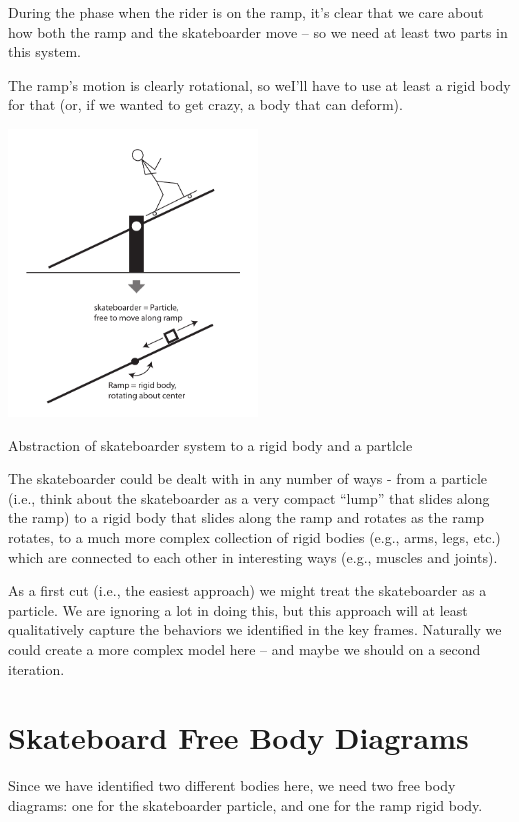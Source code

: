 \documentclass{tufte-handout}
\begin{document}
 During the phase when the rider is on the ramp, it's clear that we care about how both the ramp and the skateboarder move -- so we need at least two parts in this system. 

The ramp's motion is clearly rotational, so weI'll have to use at least a rigid body for that (or, if we wanted to get crazy, a body that can deform).

\begin{marginfigure}
\includegraphics[height=3in]{figs/skateboardabstraction1nocoords}
\caption{Abstraction of skateboarder system to a rigid body and a partlcle}
\end{marginfigure}

The skateboarder could be dealt with in any number of ways - from a particle (i.e., think about the skateboarder as a very compact ``lump'' that slides along the ramp) to a rigid body that slides along the ramp and rotates as the ramp rotates, to a much more complex collection of rigid bodies (e.g., arms, legs, etc.) which are connected to each other in interesting ways (e.g., muscles and joints).


As a first cut (i.e., the easiest approach) we might treat the skateboarder as a particle.  We are ignoring a lot in doing this, but this approach will at least qualitatively capture the behaviors we identified in the key frames.  Naturally we could create a more complex model here -- and maybe we should on a second iteration.



\section{Skateboard Free Body Diagrams}

Since we have identified two different bodies here,  we need two free body diagrams:  one for the skateboarder particle, and one for the ramp rigid body.
\end{document}
